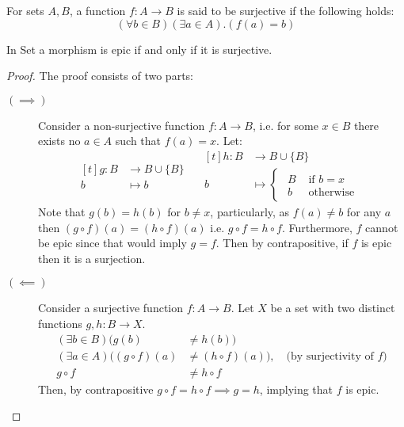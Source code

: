 \begin{definition}
  For sets $A,B$, a function $f:A\to B$ is said to be surjective if the
  following holds:
  \[(\forall b\in B)(\exists a\in A).(f(a)=b)\]
\end{definition}

\begin{theorem}\label{thm:epi_iff_sur}
  In Set a morphism is epic if and only if it is surjective.

  \begin{proof}
    The proof consists of two parts:
    \begin{description}
      \item[$(\implies)$] Consider a non-surjective function $f:A\to B$, i.e.
        for some $x\in B$ there exists no $a\in A$ such that $f(a) = x$. Let:
        \[
          \begin{aligned}[t]
            g:B &\to B \cup \{B\}\\
            b &\mapsto b
          \end{aligned}
          \quad
          \begin{aligned}[t]
            h:B &\to B \cup \{B\}\\
            b &\mapsto
            \begin{cases}
              \begin{aligned}
                B &\text{ if } b = x\\
                b &\text{ otherwise}
              \end{aligned}
            \end{cases}
          \end{aligned}
        \]
        Note that $g(b) = h(b)$ for $b\neq x$, particularly, as $f(a)\neq b$ for
        any $a$ then $(g\circ f)(a) = (h\circ f)(a)$ i.e. $g\circ f = h\circ f$.
        Furthermore, $f$ cannot be epic since that would imply $g=f$. Then by
        contrapositive, if $f$ is epic then it is a surjection.
      \item[$(\impliedby)$] Consider a surjective function $f:A\to B$. Let $X$
        be a set with two distinct functions $g, h: B \to X$.
        \[
          \begin{aligned}
            (\exists b\in B)(g(b) &\neq h(b))\\
            (\exists a\in A)((g\circ f)(a) &\neq (h\circ f)(a))
            ,\quad\text{(by surjectivity of $f$)}\\
            g\circ f &\neq h\circ f
          \end{aligned}
        \]
        Then, by contrapositive $g\circ f = h\circ f \implies g=h$, implying
        that $f$ is epic.
    \end{description}
  \end{proof}
\end{theorem}


